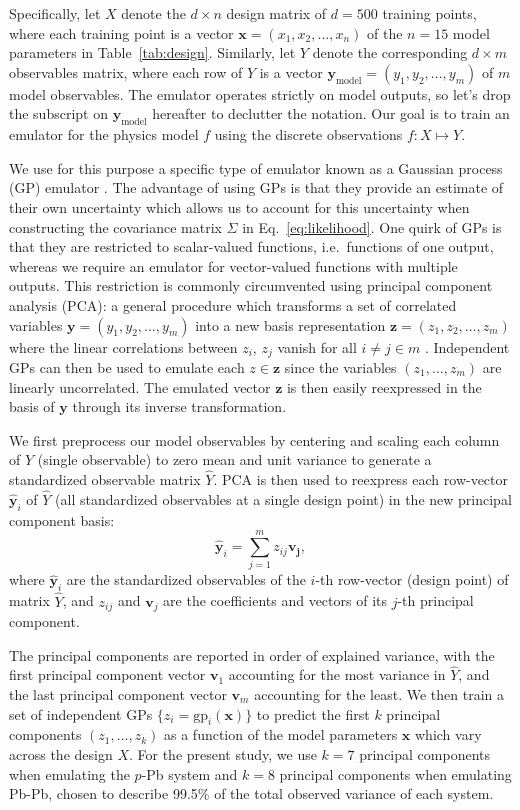 \documentclass[aps,prc,reprint,amsmath,nofootinbib]{revtex4-1}
\newcommand{\xv}{\mathbf x}
\newcommand{\yv}{\mathbf y}
\newcommand{\zv}{\mathbf z}
\newcommand{\ym}{{\mathbf y}_\text{model}}
\begin{document}
Specifically, let $X$ denote the ${d \times n}$ design matrix of $d=500$ training points, where each training point is a vector $\xv = (x_1, x_2, \dots, x_n)$ of the $n=15$ model parameters in Table~\ref{tab:design}.
Similarly, let $Y$ denote the corresponding ${d \times m}$ observables matrix, where each row of $Y$ is a vector $\ym = (y_1, y_2, \dots, y_m)$ of $m$ model observables.
The emulator operates strictly on model outputs, so let's drop the subscript on $\ym$ hereafter to declutter the notation.
Our goal is to train an emulator for the physics model $f$ using the discrete observations $f: X \mapsto Y$.

We use for this purpose a specific type of emulator known as a Gaussian process (GP) emulator \cite{Rasmussen:2006gp}.
The advantage of using GPs is that they provide an estimate of their own uncertainty which allows us to account for this uncertainty when constructing the covariance matrix $\Sigma$ in Eq.~\eqref{eq:likelihood}.
One quirk of GPs is that they are restricted to scalar-valued functions, i.e.\ functions of one output, whereas we require an emulator for vector-valued functions with multiple outputs.
This restriction is commonly circumvented using principal component analysis (PCA): a general procedure which transforms a set of correlated variables $\yv = (y_1, y_2, \dots, y_m)$ into a new basis representation $\zv = (z_1, z_2, \dots, z_m)$ where the linear correlations between $z_i$, $z_j$ vanish for all $i\ne j \in m$ \cite{Tipping:1999}.
Independent GPs can then be used to emulate each $z \in \zv$ since the variables $(z_1, \dots, z_m)$ are linearly uncorrelated.
The emulated vector $\zv$ is then easily reexpressed in the basis of $\yv$ through its inverse transformation.

We first preprocess our model observables by centering and scaling each column of $Y$ (single observable) to zero mean and unit variance to generate a standardized observable matrix $\hat{Y}$.
PCA is then used to reexpress each row-vector $\hat{\yv}_i$ of $\hat{Y}$ (all standardized observables at a single design point) in the new principal component basis:
\begin{equation}
  \hat{\yv}_i = \sum\limits_{j=1}^m z_{ij} \mathbf{v_j},
\end{equation}
where $\hat{\yv}_i$ are the standardized observables of the $i$-th row-vector (design point) of matrix $\hat{Y}$, and $z_{ij}$ and $\mathbf{v}_j$ are the coefficients and vectors of its $j$-th principal component.

The principal components are reported in order of explained variance, with the first principal component vector $\mathbf{v}_1$ accounting for the most variance in $\hat{Y}$, and the last principal component vector $\mathbf{v}_m$ accounting for the least.
We then train a set of independent GPs $\{z_i=\mathrm{gp}_i(\xv)\}$ to predict the first $k$ principal components $(z_1, \dots, z_k)$ as a function of the model parameters $\xv$ which vary across the design $X$.
For the present study, we use $k=7$ principal components when emulating the $p$-Pb system and $k=8$ principal components when emulating Pb-Pb, chosen to describe 99.5\% of the total observed variance of each system.
\end{document}
